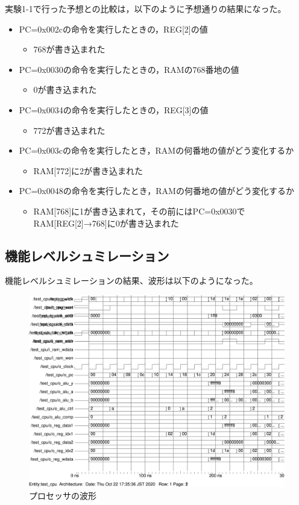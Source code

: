 実験1-1で行った予想との比較は，以下のように予想通りの結果になった。
\begin{itemize}
  \item PC=0x002cの命令を実行したときの，REG[2]の値
  \begin{itemize}
    \item 768が書き込まれた
  \end{itemize}
  \item PC=0x0030の命令を実行したときの，RAMの768番地の値
  \begin{itemize}
    \item 0が書き込まれた
  \end{itemize}
  \item PC=0x0034の命令を実行したときの，REG[3]の値
  \begin{itemize}
    \item 772が書き込まれた
  \end{itemize}
  \item PC=0x003cの命令を実行したとき，RAMの何番地の値がどう変化するか
  \begin{itemize}
    \item RAM[772]に2が書き込まれた
  \end{itemize}
  \item PC=0x0048の命令を実行したとき，RAMの何番地の値がどう変化するか
  \begin{itemize}
    \item RAM[768]に1が書き込まれて，その前にはPC=0x0030でRAM[REG[2]→768]に0が書き込まれた
  \end{itemize}
\end{itemize}

\subsection{機能レベルシュミレーション}
機能レベルシュミレーションの結果、波形は以下のようになった。
\begin{figure}[H]
  \centering
  \includegraphics[width=\linewidth]{./src/01/testCPUwave.png}
  \caption{プロセッサの波形}
\end{figure}

